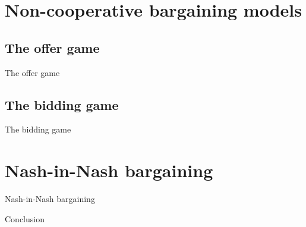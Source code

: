 \documentclass[aspectratio=169]{beamer}  %
\begin{document}
\section{Non-cooperative bargaining models}
\subsection{The offer game}
\begin{frame}{The offer game}

\end{frame}


\subsection{The bidding game}
\begin{frame}{The bidding game}

\end{frame}

\section{Nash-in-Nash bargaining}
\begin{frame}{Nash-in-Nash bargaining}
    
\end{frame}





\begin{frame}{Conclusion}

\end{frame}
\end{document}
